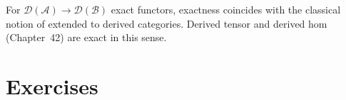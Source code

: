 \begin{remark}
For $\mathcal{D}(\mathcal{A}) \to \mathcal{D}(\mathcal{B})$ exact functors,
exactness coincides with the classical notion of  extended to derived categories. Derived
tensor and derived hom (Chapter~42) are exact in this sense.
\end{remark}


\section{Exercises}
\label{sec:stable-exercises}

